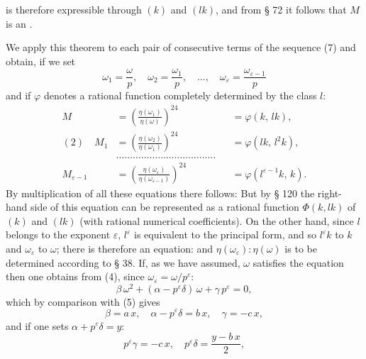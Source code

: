 
is therefore expressible  through $(k)$ and $(lk)$, and from § 72
it follows that $M$ is an .

We apply this theorem to each pair of consecutive
terms of the sequence (7) and obtain, if we set %
\[
\omega_1 = \frac{\omega}{p}, \quad \omega_2 = \frac{\omega_1}{p}, \quad \dotsc, \quad \omega_\varepsilon = \frac{\omega_{\varepsilon-1}}{p}
\]
and if $\varphi$ denotes a rational function completely determined by the
class $l$:
\[
\begin{aligned}
M &= \left(\frac{\eta(\omega_1)}{\eta(\omega)}\right)^{24} &&= \varphi(k,\, lk), \\
(2)\quad M_1 &= \left(\frac{\eta(\omega_2)}{\eta(\omega_1)}\right)^{24} &&= \varphi(lk,\, l^2k), \\
&\dotsc\dotsc\dotsc\dotsc\dotsc\dotsc\dotsc\dotsc\dotsc\dotsc\dotsc\dotsc \\
M_{\varepsilon-1} &= \left(\frac{\eta(\omega_\varepsilon)}{\eta(\omega_{\varepsilon-1})}\right)^{24} &&= \varphi(l^{\varepsilon-1}k,\, k).
\end{aligned}
\]
By multiplication of all these equations there follows:
But by § 120 the right-hand side of this equation can be represented as a
rational function $\Phi(k, lk)$ of $(k)$ and $(lk)$ (with rational numerical
coefficients).
On the other hand, since $l$ belongs to the exponent $\varepsilon$, $l^\varepsilon$ is equivalent to
the principal form, and so $l^\varepsilon k$ to $k$ and $\omega_\varepsilon$ to $\omega$; there is therefore
an equation:
and $\eta(\omega_\varepsilon) : \eta(\omega)$ is to be determined according to § 38. If, as
we have assumed, $\omega$ satisfies the equation
then one obtains from (4), since $\omega_\varepsilon = \omega/p^\varepsilon$:
\[
\beta\,\omega^2 + (\alpha - p^\varepsilon\delta)\,\omega + \gamma\,p^\varepsilon = 0,
\]
which by comparison with (5) gives
\[
\beta = a\,x, \quad \alpha - p^\varepsilon\delta = b\,x, \quad \gamma = -c\,x,
\]
and if one sets $\alpha + p^\varepsilon\delta = y$:
\[
p^\varepsilon\gamma = -c\,x, \quad p^\varepsilon\delta = \frac{y - b\,x}{2},
\]
